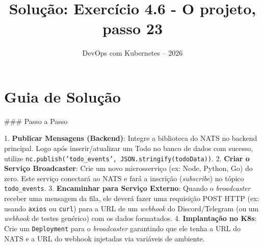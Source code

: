 \documentclass[11pt,a4paper]{article}
\title{\color{secondary}\Huge\textbf{Solução: Exercício 4.6 - O projeto, passo 23}}
\author{\color{primary}DevOps com Kubernetes -- 2026}
\date{}
\begin{document}
\maketitle

\section*{\color{primary}Guia de Solução}
\begin{tcolorbox}[colback=green!5!white,colframe=green!60!black,title=Resolução Passo a Passo]
### Passo a Passo

1. \textbf{Publicar Mensagens (Backend)}: Integre a biblioteca do NATS no backend principal. Logo após inserir/atualizar um Todo no banco de dados com sucesso, utilize \texttt{nc.publish('todo_events', JSON.stringify(todoData))}.
2. \textbf{Criar o Serviço Broadcaster}: Crie um novo microsserviço (ex: Node, Python, Go) do zero. Este serviço conectará ao NATS e fará a inscrição (\textit{subscribe}) no tópico \texttt{todo_events}.
3. \textbf{Encaminhar para Serviço Externo}: Quando o \textit{broadcaster} receber uma mensagem da fila, ele deverá fazer uma requisição POST HTTP (ex: usando \texttt{axios} ou \texttt{curl}) para a URL de um \textit{webhook} do Discord/Telegram (ou um \textit{webhook} de testes genérico) com os dados formatados.
4. \textbf{Implantação no K8s}: Crie um \texttt{Deployment} para o \textit{broadcaster} garantindo que ele tenha a URL do NATS e a URL do webhook injetadas via variáveis de ambiente.
\end{tcolorbox}
\end{document}
